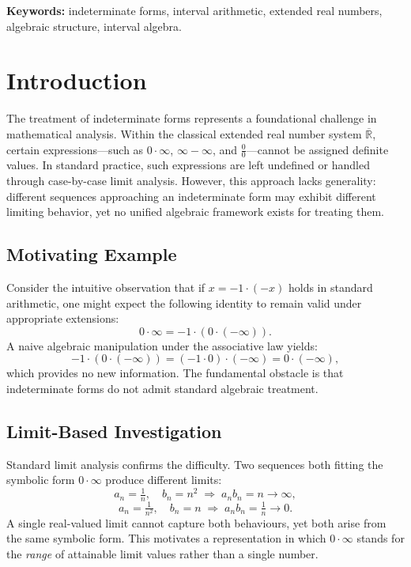 \documentclass[11pt,a4paper]{article}
\theoremstyle{paperdef}
\newcommand{\Rext}{\overline{\mathbb{R}}}
\begin{document}
\noindent\textbf{Keywords:} indeterminate forms, interval arithmetic,
extended real numbers, algebraic structure, interval algebra.

\tableofcontents
\bigskip

\section{Introduction}\label{sec:introduction}

The treatment of indeterminate forms represents a foundational
challenge in mathematical analysis. Within the classical extended real
number system $\Rext$, certain expressions---such as $0 \cdot \infty$,
$\infty - \infty$, and $\tfrac{0}{0}$---cannot be assigned definite
values. In standard practice, such expressions are left undefined or
handled through case-by-case limit analysis. However, this approach
lacks generality: different sequences approaching an indeterminate form
may exhibit different limiting behavior, yet no unified algebraic
framework exists for treating them.

\subsection{Motivating Example}

Consider the intuitive observation that if $x = -1 \cdot (-x)$ holds in
standard arithmetic, one might expect the following identity to remain
valid under appropriate extensions:
\[
0 \cdot \infty = -1 \cdot (0 \cdot (-\infty)).
\]
A naive algebraic manipulation under the associative law yields:
\[
-1 \cdot (0 \cdot (-\infty)) = (-1 \cdot 0) \cdot (-\infty)
= 0 \cdot (-\infty),
\]
which provides no new information. The fundamental obstacle is that
indeterminate forms do not admit standard algebraic treatment.

\subsection{Limit-Based Investigation}

Standard limit analysis confirms the difficulty. Two sequences both
fitting the symbolic form $0 \cdot \infty$ produce different limits:
\[
a_n = \tfrac{1}{n},\quad b_n = n^2 \;\Rightarrow\; a_n b_n = n \to \infty,
\]
\[
a_n = \tfrac{1}{n^2},\quad b_n = n \;\Rightarrow\; a_n b_n = \tfrac{1}{n} \to 0.
\]
A single real-valued limit cannot capture both behaviours, yet both
arise from the same symbolic form. This motivates a representation in
which $0 \cdot \infty$ stands for the \emph{range} of attainable limit
values rather than a single number.
\end{document}
